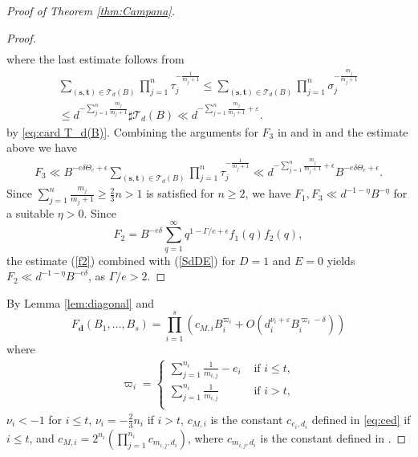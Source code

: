 \documentclass[10pt, a4paper, reqno, english]{amsart}
\theoremstyle{definition}
\numberwithin{theorem}{section}
\numberwithin{equation}{section}
\begin{document}
\begin{proof}[Proof of Theorem \ref{thm:Campana}]
\begin{proof}
\begin{gather*}
\end{gather*}
where the last estimate follows from
\begin{gather*}
\sum_{(\mathbf s,\mathbf t)\in \mathcal T_d(B)} \prod_{j=1}^n\tau_j^{-\frac 1{m_j+1}} 
\leq  \sum_{(\mathbf s,\mathbf t)\in \mathcal T_d(B)} \prod_{j=1}^n\sigma_j^{-\frac {m_j}{m_j+1}}\\
\leq  d^{-\sum_{j=1}^n\frac{m_j}{m_j+1}}\sharp \mathcal T_d(B)
\ll  d^{-\sum_{j=1}^n\frac{m_j}{m_j+1}+\varepsilon}.
\end{gather*}
by \eqref{eq:card T_d(B)}.
Combining the arguments for $F_3$ in \cite[\S3]{BY} and in \cite[\S6]{BBKOPWproc} and the estimate above we have
\begin{gather*}
F_3\ll B^{-e\delta\Theta_e +\epsilon} \sum_{(\mathbf s,\mathbf t)\in \mathcal T_d(B)} \prod_{j=1}^n\tau_j^{-\frac 1{m_j+1}} \ll d^{-\sum_{j=1}^n\frac{m_j}{m_j+1}+\epsilon} B^{-e\delta\Theta_e +\epsilon}.
\end{gather*}
Since $\sum_{j=1}^n\frac{m_j}{m_j+1}\geq \frac 23n>1$ is satisfied for $n\geq 2$, we have $F_1,F_3\ll d^{-1-\eta} B^{-\eta}$ for a suitable $\eta>0$.
Since
$$
F_2=B^{-e\delta}\sum_{q=1}^\infty q^{1-\Gamma/e+\epsilon}f_1(q)f_2(q),
$$
the estimate (\ref{f2}) combined with (\ref{SdDE}) for $D=1$ and $E=0$ yields $F_2\ll d^{-1-\eta}B^{-e\delta}$, as $\Gamma/e >2$.\end{proof}

By Lemma \ref{lem:diagonal} and \cite[Lemma 5.6]{hypmethod}
	$$ F_{\mathbf d}(B_1,\dots,B_s)=\prod_{i=1}^s \left(c_{M,i}B_i^{\varpi_i} + O(d_i^{\nu_i+\varepsilon}B_i^{\varpi_i-\delta})\right)$$
	where 
	\begin{gather}\label{eq:Campana varpi}
	\varpi_i=\begin{cases}\sum_{j=1}^{n_i}\frac 1{m_{i,j}}-e_i & \text{ if } i\leq t, \\ \sum_{j=1}^{n_i}\frac 1{m_{i,j}} & \text{ if } i>t,\\\end{cases}
	\end{gather}
	 $\nu_i<-1$ for $i\leq t$, $\nu_i=-\frac 23 n_i$ if $i>t$, $c_{M,i}$ is the constant $c_{e_i,d_i}$ defined in \eqref{eq:ced} if $i\leq t$, and $c_{M,i}=2^{n_i}\left(\prod_{j=1}^{n_i}c_{m_{i,j},d_i}\right)$, where $c_{m_{i,j},d_i}$ is the constant defined in \cite[(5.11)]{hypmethod}.
	

\end{proof}
\end{document}
